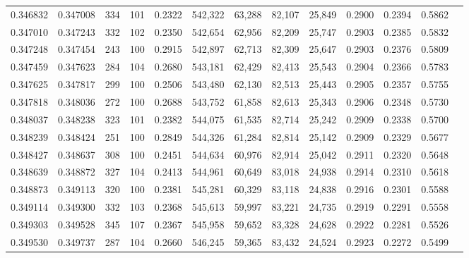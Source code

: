 \begin{tabular}{rrrrrrrrrrrrr}
0.346832 & 0.347008 &   334 & 101 &                                     0.2322 & 542,322 &  63,288 &  82,107 &  25,849 & 0.2900 & 0.2394 & 0.5862 \\
0.347010 & 0.347243 &   332 & 102 &                                     0.2350 & 542,654 &  62,956 &  82,209 &  25,747 & 0.2903 & 0.2385 & 0.5832 \\
0.347248 & 0.347454 &   243 & 100 &                                     0.2915 & 542,897 &  62,713 &  82,309 &  25,647 & 0.2903 & 0.2376 & 0.5809 \\
0.347459 & 0.347623 &   284 & 104 &                                     0.2680 & 543,181 &  62,429 &  82,413 &  25,543 & 0.2904 & 0.2366 & 0.5783 \\
0.347625 & 0.347817 &   299 & 100 &                                     0.2506 & 543,480 &  62,130 &  82,513 &  25,443 & 0.2905 & 0.2357 & 0.5755 \\
0.347818 & 0.348036 &   272 & 100 &                                     0.2688 & 543,752 &  61,858 &  82,613 &  25,343 & 0.2906 & 0.2348 & 0.5730 \\
0.348037 & 0.348238 &   323 & 101 &                                     0.2382 & 544,075 &  61,535 &  82,714 &  25,242 & 0.2909 & 0.2338 & 0.5700 \\
0.348239 & 0.348424 &   251 & 100 &                                     0.2849 & 544,326 &  61,284 &  82,814 &  25,142 & 0.2909 & 0.2329 & 0.5677 \\
0.348427 & 0.348637 &   308 & 100 &                                     0.2451 & 544,634 &  60,976 &  82,914 &  25,042 & 0.2911 & 0.2320 & 0.5648 \\
0.348639 & 0.348872 &   327 & 104 &                                     0.2413 & 544,961 &  60,649 &  83,018 &  24,938 & 0.2914 & 0.2310 & 0.5618 \\
0.348873 & 0.349113 &   320 & 100 &                                     0.2381 & 545,281 &  60,329 &  83,118 &  24,838 & 0.2916 & 0.2301 & 0.5588 \\
0.349114 & 0.349300 &   332 & 103 &                                     0.2368 & 545,613 &  59,997 &  83,221 &  24,735 & 0.2919 & 0.2291 & 0.5558 \\
0.349303 & 0.349528 &   345 & 107 &                                     0.2367 & 545,958 &  59,652 &  83,328 &  24,628 & 0.2922 & 0.2281 & 0.5526 \\
0.349530 & 0.349737 &   287 & 104 &                                     0.2660 & 546,245 &  59,365 &  83,432 &  24,524 & 0.2923 & 0.2272 & 0.5499 \\

\end{tabular}
